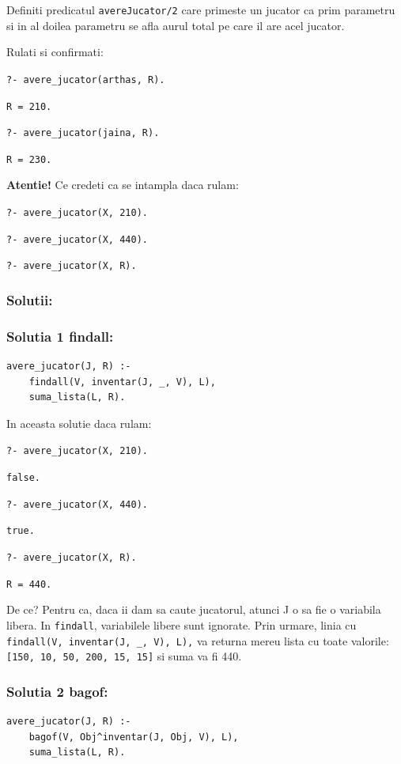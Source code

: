 Definiti predicatul \texttt{avereJucator/2} care primeste un jucator ca prim parametru
si in al doilea parametru se afla aurul total pe care il are acel jucator.

Rulati si confirmati:

\texttt{?- avere\_jucator(arthas, R).}

\texttt{R = 210.}

\texttt{?- avere\_jucator(jaina, R).}

\texttt{R = 230.}

\textbf{Atentie!} Ce credeti ca se intampla daca rulam:

\texttt{?- avere\_jucator(X, 210).}

\texttt{?- avere\_jucator(X, 440).}

\texttt{?- avere\_jucator(X, R).}


\subsubsection*{Solutii:}

\subsubsection*{Solutia 1 findall:}

\begin{lstlisting}
avere_jucator(J, R) :-
    findall(V, inventar(J, _, V), L),
    suma_lista(L, R).
\end{lstlisting}

In aceasta solutie daca rulam:

\texttt{?- avere\_jucator(X, 210).}

\texttt{false.}

\texttt{?- avere\_jucator(X, 440).}

\texttt{true.}

\texttt{?- avere\_jucator(X, R).}

\texttt{R = 440.}

De ce? Pentru ca, daca ii dam sa caute jucatorul, atunci J o sa fie o variabila libera. In \texttt{findall}, variabilele libere sunt ignorate.
Prin urmare, linia cu \texttt{findall(V, inventar(J, \_, V), L),} va returna mereu lista cu toate valorile: \texttt{[150, 10, 50, 200, 15, 15]} si suma va fi 440.


\subsubsection*{Solutia 2 bagof:}
\begin{lstlisting}
avere_jucator(J, R) :-
    bagof(V, Obj^inventar(J, Obj, V), L),
    suma_lista(L, R).
\end{lstlisting}

